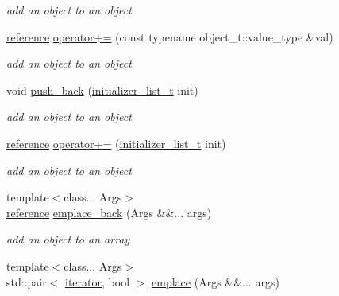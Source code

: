\begin{DoxyCompactItemize}
\begin{DoxyCompactList}\small\item\em add an object to an object \end{DoxyCompactList}\item 
\mbox{\hyperlink{classnlohmann_1_1basic__json_ac6a5eddd156c776ac75ff54cfe54a5bc}{reference}} \mbox{\hyperlink{classnlohmann_1_1basic__json_abf04978d85a2d5c4754f4806d42f46fd}{operator+=}} (const typename object\+\_\+t\+::value\+\_\+type \&val)
\begin{DoxyCompactList}\small\item\em add an object to an object \end{DoxyCompactList}\item 
void \mbox{\hyperlink{classnlohmann_1_1basic__json_a1be31ef2d2934d37a818083a4af44f99}{push\+\_\+back}} (\mbox{\hyperlink{classnlohmann_1_1basic__json_ad70a098fbc01c53497db29d3b5b656a9}{initializer\+\_\+list\+\_\+t}} init)
\begin{DoxyCompactList}\small\item\em add an object to an object \end{DoxyCompactList}\item 
\mbox{\hyperlink{classnlohmann_1_1basic__json_ac6a5eddd156c776ac75ff54cfe54a5bc}{reference}} \mbox{\hyperlink{classnlohmann_1_1basic__json_af245c2b6714d76ed99a2d02f2596d596}{operator+=}} (\mbox{\hyperlink{classnlohmann_1_1basic__json_ad70a098fbc01c53497db29d3b5b656a9}{initializer\+\_\+list\+\_\+t}} init)
\begin{DoxyCompactList}\small\item\em add an object to an object \end{DoxyCompactList}\item 
{\footnotesize template$<$class... Args$>$ }\\\mbox{\hyperlink{classnlohmann_1_1basic__json_ac6a5eddd156c776ac75ff54cfe54a5bc}{reference}} \mbox{\hyperlink{classnlohmann_1_1basic__json_abf29131f898b05aad2c01a9c80e7a002}{emplace\+\_\+back}} (Args \&\&... args)
\begin{DoxyCompactList}\small\item\em add an object to an array \end{DoxyCompactList}\item 
{\footnotesize template$<$class... Args$>$ }\\std\+::pair$<$ \mbox{\hyperlink{classnlohmann_1_1basic__json_a099316232c76c034030a38faa6e34dca}{iterator}}, bool $>$ \mbox{\hyperlink{classnlohmann_1_1basic__json_a5338e282d1d02bed389d852dd670d98d}{emplace}} (Args \&\&... args)

\end{DoxyCompactItemize}
